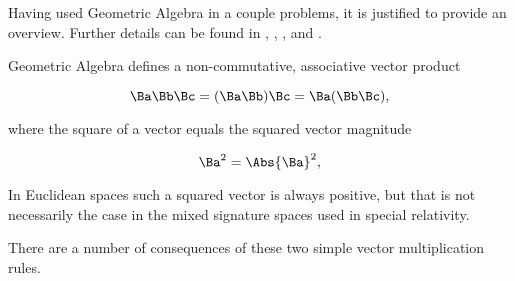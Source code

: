 %
%

Having used Geometric Algebra in a couple problems, it is justified to provide an overview.  Further details can be found in
\citep{dorst2007gac},
\citep{doran2003gap},
\citep{aMacdonaldVAGC},
and
\citep{hestenes1999nfc}.

Geometric Algebra defines a non-commutative, associative vector product

\begin{equation}\label{eqn:gaTutorial:20}
\Ba \Bb \Bc
=
(\Ba \Bb) \Bc
=
\Ba (\Bb \Bc),
\end{equation}

where the square of a vector equals the squared vector magnitude

\begin{dmath}\label{eqn:gaTutorial:40}
\Ba^2 = \Abs{\Ba}^2,
\end{dmath}

In Euclidean spaces such a squared vector is always positive, but that is not necessarily the case in the mixed signature spaces used in special relativity.

There are a number of consequences of these two simple vector multiplication rules.

